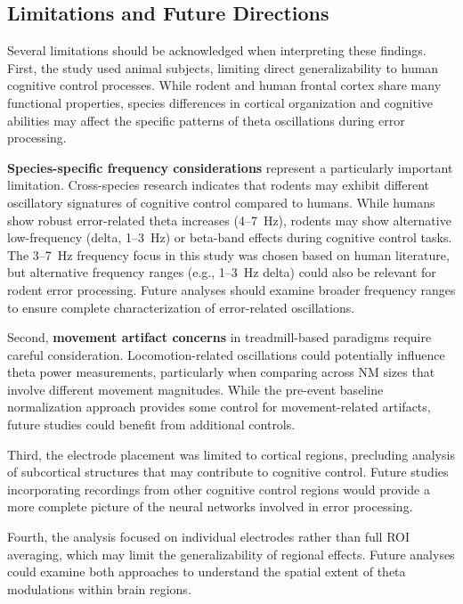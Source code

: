 \documentclass[11pt]{article}
\begin{document}
\subsection{Limitations and Future Directions}

Several limitations should be acknowledged when interpreting these findings. First, the study used animal subjects, limiting direct generalizability to human cognitive control processes. While rodent and human frontal cortex share many functional properties, species differences in cortical organization and cognitive abilities may affect the specific patterns of theta oscillations during error processing.

\textbf{Species-specific frequency considerations} represent a particularly important limitation. Cross-species research indicates that rodents may exhibit different oscillatory signatures of cognitive control compared to humans. While humans show robust error-related theta increases (4--7~Hz), rodents may show alternative low-frequency (delta, 1--3~Hz) or beta-band effects during cognitive control tasks. The 3--7~Hz frequency focus in this study was chosen based on human literature, but alternative frequency ranges (e.g., 1--3~Hz delta) could also be relevant for rodent error processing. Future analyses should examine broader frequency ranges to ensure complete characterization of error-related oscillations.

Second, \textbf{movement artifact concerns} in treadmill-based paradigms require careful consideration. Locomotion-related oscillations could potentially influence theta power measurements, particularly when comparing across NM sizes that involve different movement magnitudes. While the pre-event baseline normalization approach provides some control for movement-related artifacts, future studies could benefit from additional controls.

Third, the electrode placement was limited to cortical regions, precluding analysis of subcortical structures that may contribute to cognitive control. Future studies incorporating recordings from other cognitive control regions would provide a more complete picture of the neural networks involved in error processing.

Fourth, the analysis focused on individual electrodes rather than full ROI averaging, which may limit the generalizability of regional effects. Future analyses could examine both approaches to understand the spatial extent of theta modulations within brain regions.
\end{document}
